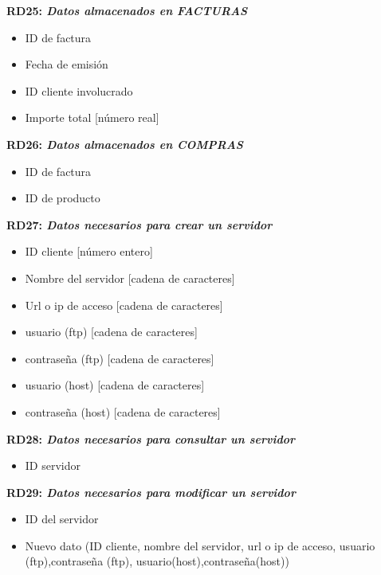 \documentclass[paper=a4, fontsize=11pt, spanish]{scrartcl}
\begin{document}
	\setlength{\parindent}{0em}
	\textbf{RD25: \textit{Datos almacenados en FACTURAS}}
	\setlength{\parindent}{2em}
	\begin{itemize}
		\item ID de factura
		\item Fecha de emisión 
		\item ID cliente involucrado
		\item Importe total [número real]
	\end{itemize}
	
	\setlength{\parindent}{0em}
	\textbf{RD26: \textit{Datos almacenados en COMPRAS}}
	\setlength{\parindent}{2em}
	\begin{itemize}
		\item ID de factura
		\item ID de producto
	\end{itemize}

\setlength{\parindent}{0em}
\textbf{RD27: \textit{Datos necesarios para crear un servidor}}
\setlength{\parindent}{2em}
\begin{itemize}
  \item ID cliente [número entero]
  \item Nombre del servidor [cadena de caracteres]
  \item Url o ip de acceso [cadena de caracteres]
  \item usuario (ftp) [cadena de caracteres]
  \item contraseña (ftp) [cadena de caracteres]
  \item usuario (host) [cadena de caracteres]
  \item contraseña (host) [cadena de caracteres]
\end{itemize}

\setlength{\parindent}{0em}
\textbf{RD28: \textit{Datos necesarios para consultar un servidor}}
\setlength{\parindent}{2em}
\begin{itemize}
  \item ID servidor
\end{itemize}

\setlength{\parindent}{0em}
\textbf{RD29: \textit{Datos necesarios para modificar un servidor}}
\setlength{\parindent}{2em}
\begin{itemize}
  \item ID del servidor
  \item Nuevo dato (ID cliente, nombre del servidor, url o ip de acceso, usuario (ftp),contraseña (ftp), usuario(host),contraseña(host))
\end{itemize}
\end{document}
